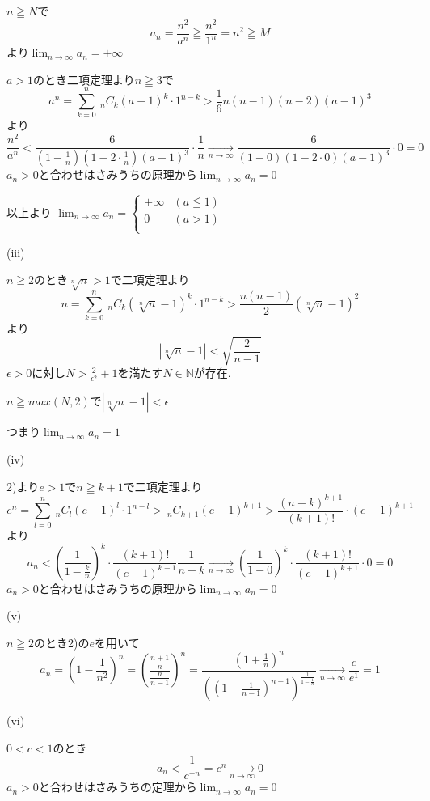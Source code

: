 \documentclass{jsarticle}
\begin{document}
       $n\geqq N$で
       \[a_n = \frac{n^2}{a^n}\geqq \frac{n^2}{1^n}=n^2  \geqq M\]
       より$\displaystyle\lim_{n\to\infty}a_n=+\infty$
       
       $a>1$のとき二項定理より$n\geqq3$で
       \[a^n =\sum_{k=0}^n \ _nC_k(a-1)^k\cdot 1^{n-k}>\frac{1}{6}n(n-1)(n-2)(a-1)^3\]
       より
       \[\frac{n^2}{a^n}<\frac{6}{(1-\frac{1}{n})(1-2\cdot\frac{1}{n})(a-1)^3}\cdot\frac{1}{n}\xrightarrow[n\to \infty]{}\frac{6}{(1-0)(1-2\cdot 0)(a-1)^3}\cdot0=0\]
       $a_n>0$と合わせはさみうちの原理から$\displaystyle\lim_{n\to\infty}a_n=0$
       
       以上より
       $\displaystyle\lim_{n\to\infty}a_n=\begin{cases}
       +\infty & (a\leqq 1)\\
       0 & (a> 1)\\
       \end{cases}$
       
       (iii)
       
       $n\geqq2$のとき$\sqrt[n]{n}>1$で二項定理より
       \[n=\sum_{k=0}^n \ _nC_k (\sqrt[n]{n}-1)^k\cdot 1^{n-k}
       >\frac{n(n-1)}{2}(\sqrt[n]{n}-1)^2\]
       より
       \[|\sqrt[n]{n}-1| < \sqrt{\frac{2}{n-1}}\]
       $\epsilon >0$に対し$N>\frac{2}{\epsilon^2}+1$を満たす$N\in\mathbb{N}$が存在.
       
       $n\geqq max(N,2)$で$|\sqrt[n]{n}-1| < \epsilon$
       
       つまり$\displaystyle\lim_{n\to\infty}a_n=1$
       
       (iv)
       
       2)より$e>1$で$n\geqq k+1$で二項定理より
       \[e^n = \sum_{l=0}^n \ _nC_l(e-1)^l\cdot 1^{n-l}> \ _nC_{k+1}(e-1)^{k+1} > \frac{(n-k)^{k+1}}{(k+1)!}\cdot (e-1)^{k+1}\]
       より
       \[a_n <(\frac{1}{1-\frac{k}{n}})^k\cdot \frac{(k+1)!}{(e-1)^{k+1}}\frac{1}{n-k}\xrightarrow[n\to\infty]{}(\frac{1}{1-0})^k\cdot \frac{(k+1)!}{(e-1)^{k+1}}\cdot 0 = 0\]
       $a_n>0$と合わせはさみうちの原理から$\displaystyle\lim_{n\to\infty}a_n=0$
       
       (v)
       
       $n\geqq 2$のとき2)の$e$を用いて
       \[a_n=(1-\frac{1}{n^2})^n=(\frac{\frac{n+1}{n}}{\frac{n}{n-1}})^n=\frac{(1+\frac{1}{n})^n}{((1+\frac{1}{n-1})^{n-1})^\frac{1}{1-\frac{1}{n}}}\xrightarrow[n\to\infty]{}\frac{e}{e^{1}}=1\]
       
       (vi)
       
       $0<c<1$のとき
       \[a_n < \frac{1}{c^{-n}}=c^n\xrightarrow[n\to\infty]{}0\]
       $a_n>0$と合わせはさみうちの定理から$\displaystyle \lim_{n\to \infty}a_n=0$
       
\end{document}
